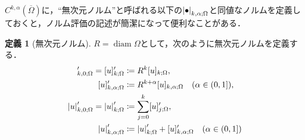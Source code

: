 \documentclass[a4paper]{ltjsarticle}
\newcommand{\Om}{\Omega}
\newcommand{\Ombar}{\overline{\Omega}}
\newcommand{\1}{\mathbbm{1}}
\DeclareMathOperator{\diam}{\mathrm{diam}}
\numberwithin{equation}{section}
\theoremstyle{definition}
\newtheorem{dfn}[thm]{定義}
\begin{document}
$C^{k,\alpha}(\Ombar)$に，``無次元ノルム''と呼ばれる以下の$\abs{\bullet}_{k,\alpha;\Om}$と同値なノルムを定義しておくと，ノルム評価の記述が簡潔になって便利なことがある．
\begin{dfn}[無次元ノルム]
    $R=\diam\Om$として，次のように無次元ノルムを定義する．
    \begin{align}
        [u]_{k,0;\Om}'=[u]_{k;\Om}'&\coloneqq R^k[u]_{k;\Om},\\
        [u]_{k,\alpha;\Om}'&\coloneqq R^{k+\alpha}[u]_{k,\alpha;\Om}\quad (\alpha\in(0,1]),\\
        \abs{u}_{k,0;\Om}'=\abs{u}_{k;\Om}'&\coloneqq \sum_{j=0}^k [u]_{j;\Om}',\\
        \abs{u}_{k,\alpha;\Om}'&\coloneqq \abs{u}_{k;\Om}'+[u]_{k,\alpha;\Om}'\quad (\alpha\in(0,1])
    \end{align}
\end{dfn}
\end{document}
